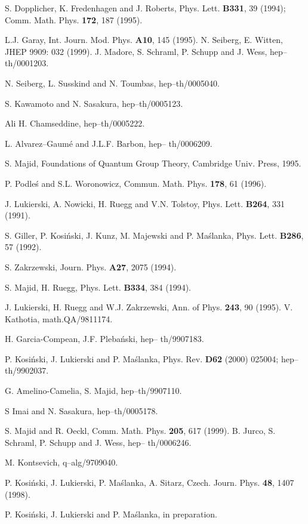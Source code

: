 \documentclass[a4paper,a4paper]{article}
\begin{document}
\begin{thebibliography}{9}
\bibitem{[1a]} S. Dopplicher, K. Fredenhagen and J. Roberts,
Phys. Lett. {\bf B331},  39 (1994);
Comm. Math. Phys. {\bf 172}, 187 (1995).

\bibitem{[1]} L.J. Garay, Int. Journ. Mod. Phys. {\bf A10},
 145 (1995).
 \bibitem{[2]} N. Seiberg, E. Witten, JHEP 9909: 032 (1999).
 \bibitem{[3]} J. Madore, S. Schraml, P. Schupp and J. Wess, 
  hep--th/0001203.
  
  \bibitem{[4]} N. Seiberg, L. Susskind and N. Toumbas, 
   hep--th/0005040.
   
   \bibitem{[5]} S. Kawamoto and N. Sasakura, hep--th/0005123.
   
   \bibitem{[6]} Ali H. Chamseddine, hep--th/0005222.
   
   \bibitem{[7]} L. Alvarez--Gaum\'{e} and J.L.F. Barbon, hep--
th/0006209.
   
   \bibitem{[8]} S. Majid, Foundations of Quantum Group Theory,
Cambridge Univ. Press, 1995.

\bibitem{[9]} P. Podle\'{s} and S.L. Woronowicz, Commun. Math.
Phys. {\bf 178}, 61 (1996).

\bibitem{[11]} J. Lukierski, A. Nowicki,  H. Ruegg and V.N. Tolstoy,
  Phys. Lett. {\bf B264}, 331 (1991).
  
  \bibitem{[12]} S. Giller, P. Kosi\'{n}ski, J. Kunz, M.
Majewski and P. Ma\'{s}lanka, Phys. Lett. {\bf B286}, 57 (1992).

\bibitem{[13]} S. Zakrzewski, Journ. Phys. {\bf A27}, 2075 (1994).

\bibitem{[14]} S. Majid, H. Ruegg, Phys. Lett. {\bf B334}, 384 (1994).

\bibitem{[15]} J. Lukierski, H. Ruegg and W.J. Zakrzewski, Ann.
of Phys. {\bf 243}, 90 (1995).
\bibitem{[16]} V. Kathotia, math.QA/9811174.

\bibitem{[17]} H. Garcia-Compean, J.F. Pleba\'{n}ski, hep--
th/9907183.

\bibitem{[18]} P. Kosi\'{n}ski, J. Lukierski and P.
Ma\'{s}lanka, 
Phys. Rev. {\bf D62} (2000) 025004; hep--th/9902037.

\bibitem{[19]} G. Amelino-Camelia, S. Majid, hep--th/9907110.

\bibitem{[20]} S Imai and N. Sasakura, hep--th/0005178.

\bibitem{[21a]} S. Majid and R. Oeckl, Comm. Math. Phys. {\bf 205},
 617 (1999).
\bibitem{[21]} B. Jurco, S. Schraml, P. Schupp and J. Wess, hep--
th/0006246.

\bibitem{[22]} M. Kontsevich, q--alg/9709040.

\bibitem{[23]} P. Kosi\'{n}ski, J. Lukierski, P. Ma\'{s}lanka,
A. Sitarz, Czech. Journ. Phys. {\bf 48}, 1407 (1998).

\bibitem{[24]} P. Kosi\'{n}ski, J. Lukierski and P. Ma\'{s}lanka,
 in preparation.


\end{thebibliography}
\end{document}
